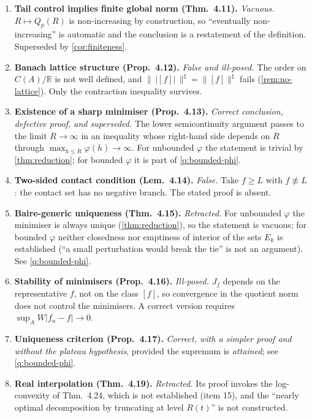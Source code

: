 \documentclass[11pt,a4paper]{article}
\numberwithin{equation}{section}
\theoremstyle{plain}
\theoremstyle{definition}
\theoremstyle{remark}
\newcommand{\R}{\mathbb{R}}
\begin{document}
\begin{enumerate}
\item \textbf{Tail control implies finite global norm (Thm.~4.11).} \emph{Vacuous.}
$R\mapsto Q_p(R)$ is non-increasing by construction, so ``eventually non-increasing'' is
automatic and the conclusion is a restatement of the definition. Superseded by
\cref{cor:finiteness}.

\item \textbf{Banach lattice structure (Prop.~4.12).} \emph{False and ill-posed.} The
order on $C(A)/\R$ is not well defined, and
$\|\,|[f]|\,\|^{\sharp}=\|[f]\|^{\sharp}$ fails (\cref{rem:no-lattice}). Only the
contraction inequality survives.

\item \textbf{Existence of a sharp minimiser (Prop.~4.13).} \emph{Correct conclusion,
defective proof, and superseded.} The lower semicontinuity argument passes to the limit
$R\to\infty$ in an inequality whose right-hand side depends on $R$ through
$\max_{h\le R}\varphi(h)\to\infty$. For unbounded $\varphi$ the statement is trivial by
\cref{thm:reduction}; for bounded $\varphi$ it is part of \cref{q:bounded-phi}.

\item \textbf{Two-sided contact condition (Lem.~4.14).} \emph{False.} Take $f\ge L$ with
$f\not\equiv L$: the contact set has no negative branch. The stated proof is absent.

\item \textbf{Baire-generic uniqueness (Thm.~4.15).} \emph{Retracted.} For unbounded
$\varphi$ the minimiser is always unique (\cref{thm:reduction}), so the statement is
vacuous; for bounded $\varphi$ neither closedness nor emptiness of interior of the sets
$E_k$ is established (``a small perturbation would break the tie'' is not an argument).
See \cref{q:bounded-phi}.

\item \textbf{Stability of minimisers (Prop.~4.16).} \emph{Ill-posed.} $J_f$ depends on the
representative $f$, not on the class $[f]$, so convergence in the quotient norm does not
control the minimisers. A correct version requires $\sup_AW|f_n-f|\to0$.

\item \textbf{Uniqueness criterion (Prop.~4.17).} \emph{Correct, with a simpler proof and
without the plateau hypothesis}, provided the supremum is \emph{attained}; see
\cref{q:bounded-phi}.

\item \textbf{Real interpolation (Thm.~4.19).} \emph{Retracted.} Its proof invokes the
log-convexity of Thm.~4.24, which is not established (item 15), and the ``nearly optimal
decomposition by truncating at level $R(t)$'' is not constructed.


\end{enumerate}
\end{document}
